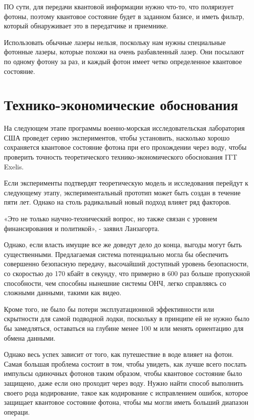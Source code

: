 \documentclass[a4paper,12pt]{article} %
\begin{document}
ПО сути, для передачи квантовой информации нужно что-то, что поляризует фотоны, поэтому квантовое состояние будет в заданном базисе, и иметь фильтр, который обнаруживает это в передатчике и приемнике.

Использовать обычные лазеры нельзя, поскольку нам нужны специальные фотонные лазеры, которые похожи на очень разбавленный лазер. Они посылают по одному фотону за раз, и каждый фотон имеет четко определенное квантовое состояние.

\section*{Технико-экономические обоснования}

\hspace{13pt} На следующем этапе программы военно-морская исследовательская лаборатория США проведет серию экспериментов, чтобы установить, насколько хорошо сохраняется квантовое состояние фотона при его прохождении через воду, чтобы проверить точность теоретического технико-экономического обоснования ITT Exelis.

Если эксперименты подтвердят теоретическую модель и исследования перейдут к следующему этапу, экспериментальный прототип может быть создан в течение пяти лет. Однако на столь радикальный новый подход влияет ряд факторов.

«Это не только научно-технический вопрос, но также связан с уровнем финансирования и политикой», - заявил Ланзагорта.

Однако, если власть имущие все же доведут дело до конца, выгоды могут быть существенными. Предлагаемая система потенциально могла бы обеспечить совершенно безопасную передачу, высочайший доступный уровень безопасности, со скоростью до 170 кбайт в секунду, что примерно в 600 раз больше пропускной способности, чем способны нынешние системы ОНЧ, легко справляясь со сложными данными, такими как видео.

Кроме того, не было бы потери эксплуатационной эффективности или скрытности для самой подводной лодки, поскольку в принципе ей не нужно было бы замедляться, оставаться на глубине менее 100 м или менять ориентацию для обмена данными.

Однако весь успех зависит от того, как путешествие в воде влияет на фотон. Самая большая проблема состоит в том, чтобы увидеть, как лучше всего послать импульсы одиночных фотонов таким образом, чтобы квантовое состояние было защищено, даже если оно проходит через воду. Нужно найти способ выполнить своего рода кодирование, такое как кодирование с исправлением ошибок, которое защищает квантовое состояние фотона, чтобы мы могли иметь больший диапазон операци.
\end{document}
